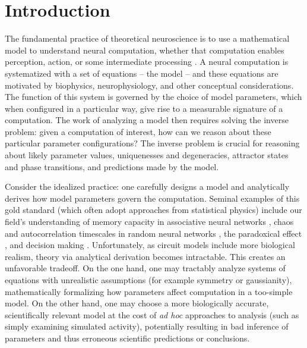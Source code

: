 \documentclass[11pt]{article}
\begin{document}
\section{Introduction}
The fundamental practice of theoretical neuroscience is to use a mathematical model to understand neural computation, whether that computation enables perception, action, or some intermediate processing \cite{abbott2008theoretical}.  
A neural computation is systematized with a set of equations -- the model -- and these equations are motivated by biophysics, neurophysiology, and other conceptual considerations.
The function of this system is governed by the choice of model parameters, which when configured in a particular way, give rise to a measurable signature of a computation.   
The work of analyzing a model then requires solving the inverse problem: given a computation of interest, how can we reason about these particular parameter configurations?  
The inverse problem is crucial for reasoning about likely parameter values, uniquenesses and degeneracies, attractor states and phase transitions, and predictions made by the model.  

Consider the idealized practice: one carefully designs a model and analytically derives how model parameters govern the computation.  
Seminal examples of this gold standard (which often adopt approaches from statistical physics) include our field's understanding of memory capacity in associative neural networks \cite{hopfield1982neural}, chaos and autocorrelation timescales in random neural networks \cite{sompolinsky1988chaos}, the paradoxical effect \cite{tsodyks1997paradoxical}, and decision making \cite{wong2006recurrent}.
Unfortunately, as circuit models include more biological realism, theory via analytical derivation becomes intractable.  
This creates an unfavorable tradeoff.  On the one hand, one may tractably analyze systems of equations with unrealistic assumptions (for example symmetry or gaussianity), mathematically formalizing how parameters affect computation in a too-simple model.  
On the other hand, one may choose a more biologically accurate, scientifically relevant model at the cost of \emph{ad hoc} approaches to analysis (such as simply examining simulated activity), potentially resulting in bad inference of parameters and thus erroneous scientific predictions or conclusions.
 
\end{document}
